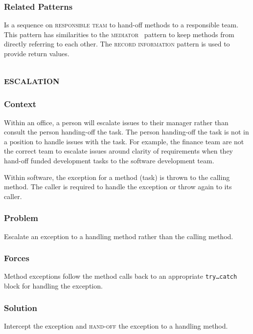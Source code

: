 \documentclass[prodmode]{style/acmlarge}
\begin{document}
\subsubsection*{Related Patterns} Is a sequence on \textsc{responsible team} to
hand-off methods to a responsible team.  This pattern has similarities to the
\textsc{mediator}~\cite{gof} pattern to keep methods from directly referring to
each other.  The \textsc{record information} pattern is used to provide return
values.



\subsection{\textsc{\textbf{escalation}}}

\subsubsection*{Context} Within an office, a person will escalate issues to
their manager rather than consult the person handing-off the task.  The person
handing-off the task is not in a position to handle issues with the task.  For
example, the finance team are not the correct team to escalate issues around
clarity of requirements when they hand-off funded development tasks to the
software development team.

Within software, the exception for a method (task) is thrown to the calling
method.  The caller is required to handle the exception or throw again to its
caller.

\subsubsection*{\textbf{Problem}} Escalate an exception to a handling method rather than
the calling method.

\subsubsection*{Forces} Method exceptions follow the method calls back to an
appropriate \texttt{try\ldots catch} block for handling the exception.

\subsubsection*{\textbf{Solution}} Intercept the exception and \textsc{hand-off} the
exception to a handling method.
\end{document}

